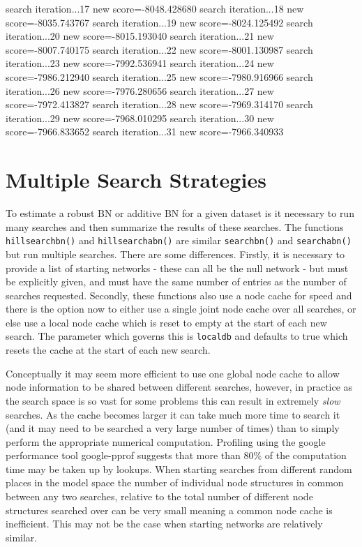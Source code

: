 \documentclass[nojss]{jss}
\begin{document}
\begin{Schunk}
\begin{Soutput}
search iteration...17 new score=-8048.428680
search iteration...18 new score=-8035.743767
search iteration...19 new score=-8024.125492
search iteration...20 new score=-8015.193040
search iteration...21 new score=-8007.740175
search iteration...22 new score=-8001.130987
search iteration...23 new score=-7992.536941
search iteration...24 new score=-7986.212940
search iteration...25 new score=-7980.916966
search iteration...26 new score=-7976.280656
search iteration...27 new score=-7972.413827
search iteration...28 new score=-7969.314170
search iteration...29 new score=-7968.010295
search iteration...30 new score=-7966.833652
search iteration...31 new score=-7966.340933
\end{Soutput}
\end{Schunk}

\section{Multiple Search Strategies}
To estimate a robust BN or additive BN for a given dataset is it necessary to run many searches and then summarize the results of these searches. The functions {\tt hillsearchbn()} and {\tt hillsearchabn()} are similar {\tt searchbn()} and {\tt searchabn()} but run multiple searches. There are some differences. Firstly, it is necessary to provide a list of starting networks - these can all be the null network - but must be explicitly given, and must have the same number of entries as the number of searches requested. Secondly, these functions also use a node cache for speed and there is the option now to either use a single joint node cache over all  searches, or else use a local node cache which is reset to empty at the start of each new search. The parameter which governs this is {\tt localdb} and defaults to true which resets the cache at the start of each new search. 

Conceptually it may seem more efficient to use one global node cache to allow node information to be shared between different searches, however, in practice as the search space is so vast for some problems this can result in extremely \emph{slow} searches. As the cache becomes larger it can take much more time to search it (and it may need to be searched a very large number of times) than to simply perform the appropriate numerical computation. Profiling using the google performance tool google-pprof suggests that more than 80\% of the computation time may be taken up by lookups. When starting searches from different random places in the model space the number of individual node structures in common between any two searches, relative to the total number of different node structures searched over can be very small meaning a common node cache is inefficient. This may not be the case when starting networks are relatively similar.   
\end{document}
